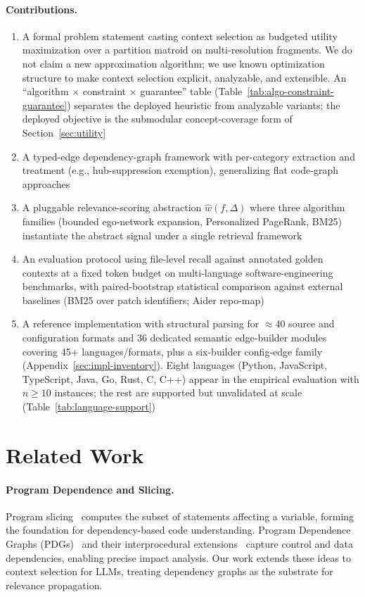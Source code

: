 \documentclass[11pt, a4paper]{article}
\begin{document}
\paragraph{Contributions.}
\begin{enumerate}
    \item A formal problem statement casting context selection as budgeted utility maximization over a partition matroid on multi-resolution fragments. We do not claim a new approximation algorithm; we use known optimization structure to make context selection explicit, analyzable, and extensible. An ``algorithm $\times$ constraint $\times$ guarantee'' table (Table~\ref{tab:algo-constraint-guarantee}) separates the deployed heuristic from analyzable variants; the deployed objective is the submodular concept-coverage form of Section~\ref{sec:utility}
    \item A typed-edge dependency-graph framework with per-category extraction and treatment (e.g., hub-suppression exemption), generalizing flat code-graph approaches
    \item A pluggable relevance-scoring abstraction $\hat{w}(f, \Delta)$ where three algorithm families (bounded ego-network expansion, Personalized PageRank, BM25) instantiate the abstract signal under a single retrieval framework
    \item An evaluation protocol using file-level recall against annotated golden contexts at a fixed token budget on multi-language software-engineering benchmarks, with paired-bootstrap statistical comparison against external baselines (BM25 over patch identifiers; Aider repo-map)
    \item A reference implementation with structural parsing for $\approx$40 source and configuration formats and 36 dedicated semantic edge-builder modules covering 45+ languages/formats, plus a six-builder config-edge family (Appendix~\ref{sec:impl-inventory}). Eight languages (Python, JavaScript, TypeScript, Java, Go, Rust, C, C++) appear in the empirical evaluation with $n{\geq}10$ instances; the rest are supported but unvalidated at scale (Table~\ref{tab:language-support})
\end{enumerate}

\newpage
\section{Related Work}

\paragraph{Program Dependence and Slicing.}
Program slicing~\cite{weiser1984program} computes the subset of statements affecting a variable, forming the foundation for dependency-based code understanding. Program Dependence Graphs (PDGs)~\cite{ferrante1987program} and their interprocedural extensions~\cite{horwitz1990interprocedural} capture control and data dependencies, enabling precise impact analysis. Our work extends these ideas to context selection for LLMs, treating dependency graphs as the substrate for relevance propagation.
\end{document}
